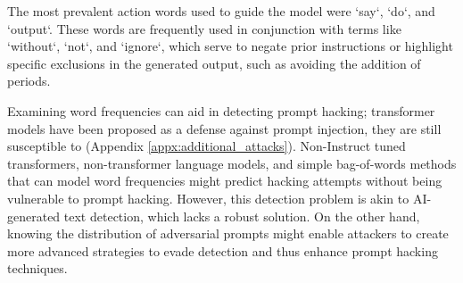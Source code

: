 The most prevalent action words used to guide the model were `say`, `do`, and `output`. These words are frequently used in conjunction with terms like `without`, `not`, and `ignore`, which serve to negate prior instructions or highlight specific exclusions in the generated output, such as avoiding the addition of periods.

Examining word frequencies can aid in detecting prompt hacking; transformer models have been proposed as a defense against prompt injection, they are still susceptible to \recursive{} (Appendix \ref{appx:additional_attacks}). Non-Instruct tuned transformers, non-transformer language models, and simple bag-of-words methods that can model word frequencies might predict hacking attempts without being vulnerable to prompt hacking. However, this detection problem is akin to AI-generated text detection, which lacks a robust solution. On the other hand, knowing the distribution of adversarial prompts might enable attackers to create more advanced strategies to evade detection and thus enhance prompt hacking techniques.





